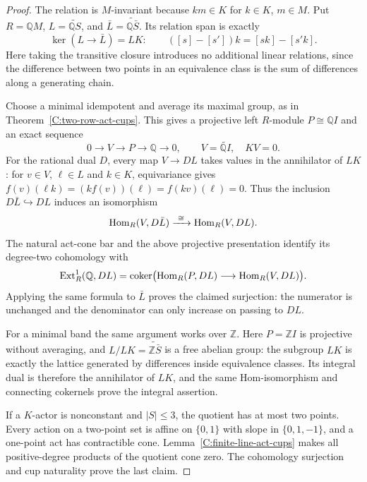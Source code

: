 \begin{proof}
The relation is $M$-invariant because $km\in K$ for $k\in K$,
$m\in M$.  Put $R=\mathbb QM$, $L=\widetilde{\mathbb QS}$,
and $\bar L=\widetilde{\mathbb Q\bar S}$.  Its relation span
is exactly
\[
 \ker(L\longrightarrow\bar L)=LK:
 \qquad ([s]-[s'])k=[sk]-[s'k].
\]
Here taking the transitive closure introduces no additional linear
relations, since the difference between two points in an equivalence
class is the sum of differences along a generating chain.

Choose a minimal idempotent and average its maximal group, as in
Theorem~\ref{C:two-row-act-cups}.  This gives a projective left
$R$-module $P\cong\mathbb QI$ and an exact sequence
\[
 0\longrightarrow V\longrightarrow P\longrightarrow\mathbb Q
       \longrightarrow0,
 \qquad V=\widetilde{\mathbb QI},\quad KV=0.
\]
For the rational dual $D$, every map $V\to DL$ takes values in
the annihilator of $LK$: for $v\in V$, $\ell\in L$ and $k\in K$,
equivariance gives $f(v)(\ell k)=(kf(v))(\ell)=f(kv)(\ell)=0$.
Thus the inclusion $D\bar L\hookrightarrow DL$ induces an
isomorphism
\[
 \operatorname{Hom}_R(V,D\bar L)\xrightarrow{\ \cong\ }\operatorname{Hom}_R(V,DL).
\]
The natural act-cone bar and the above projective presentation
identify its degree-two cohomology with
\[
 \operatorname{Ext}^1_R(\mathbb Q,DL)
  =\operatorname{coker}\bigl(\operatorname{Hom}_R(P,DL)
                         \longrightarrow\operatorname{Hom}_R(V,DL)\bigr).
\]
Applying the same formula to $\bar L$ proves the claimed
surjection: the numerator is unchanged and the denominator can
only increase on passing to $DL$.

For a minimal band the same argument works over $\mathbb Z$.
Here $P=\mathbb ZI$ is projective without averaging, and
$L/LK=\widetilde{\mathbb Z\bar S}$ is a free abelian group:
the subgroup $LK$ is exactly the lattice generated by differences
inside equivalence classes.  Its integral dual is therefore the
annihilator of $LK$, and the same Hom-isomorphism and connecting
cokernels prove the integral assertion.

If a $K$-actor is nonconstant and $|S|\leq3$, the quotient has
at most two points.  Every action on a two-point set is affine
on $\{0,1\}$ with slope in $\{0,1,-1\}$, and a one-point act
has contractible cone.  Lemma~\ref{C:finite-line-act-cups} makes
all positive-degree products of the quotient cone zero.
The cohomology surjection and cup naturality prove the last claim.
\end{proof}

